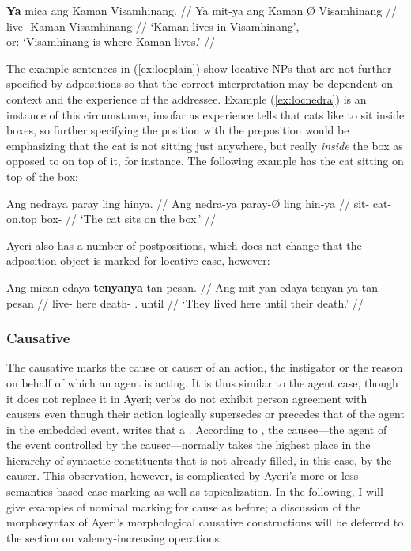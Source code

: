\a\label{ex:locmit}\begingl
	\gla \textbf{Ya} mica ang Kaman {} Visamhinang. //
	\glb Ya mit-ya ang Kaman Ø Visamhinang //
	\glc \LocT{} live-\TsgM{} \Aarg{} Kaman \Top{} Visamhinang //
	\glft `Kaman lives in Visamhinang',\\
		or: `Visamhinang is where Kaman lives.' //
\endgl

\xe

The example sentences in (\ref{ex:locplain}) show locative NPs that are not
further specified by adpositions so that the correct interpretation may be
dependent on context and the experience of the addressee. Example
(\ref{ex:locnedra}) is an instance of this circumstance, insofar as experience
tells that cats like to sit inside boxes, so further specifying the position
with the preposition  would be emphasizing that the
cat is not sitting just anywhere, but really \emph{inside} the box as opposed
to on top of it, for instance. The following example has the cat sitting on top
of the box:

\ex\begingl
	\gla Ang nedraya paray ling hinya. //
	\glb Ang nedra-ya paray-Ø ling hin-ya //
	\glc \AgtT{} sit-\TsgM{} cat-\Top{} on.top box-\Loc{} //
	\glft `The cat sits on the box.' //
\endgl\xe

Ayeri also has a number of postpositions, which does not change that the adposition object is marked for locative case, however:

\ex\begingl
	\gla Ang mican edaya \textbf{tenyanya} tan pesan. //
	\glb Ang mit-yan edaya tenyan-ya tan pesan //
	\glc \AgtT{} live-\TplM{} here death-\Loc{} \TplM{}.\Gen{} until //
	\glft `They lived here until their death.' //
\endgl\xe


\subsubsection{Causative}

The causative marks the cause or causer of an action, the instigator or the
reason on behalf of which an agent is acting. It is thus similar to the agent
case, though it does not replace it in Ayeri; verbs do not exhibit person
agreement with causers even though their action logically supersedes or
precedes that of the agent in the embedded event. \citet{dixon2000} writes that
a .
According to \citet[176]{comrie1989}, the causee---the agent of the event
controlled by the causer---normally takes the highest place in the hierarchy of
syntactic constituents that is not already filled, in this case, by the causer.
This observation, however, is complicated by Ayeri's more or less 
semantics-based case marking as well as topicalization. In the following, I 
will give examples of nominal marking for cause as before; a discussion of the
morphosyntax of Ayeri's morphological causative constructions will be deferred
to the section on valency-increasing operations. %

